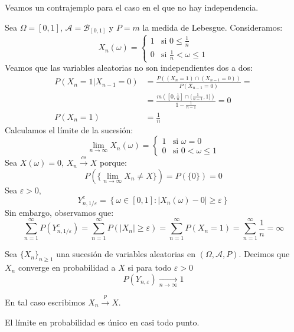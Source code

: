 \begin{example}
    Veamos un contrajemplo para el caso en el que no hay independencia.

    Sea $\Omega = [0, 1]$, $\mathcal{A} = \mathcal{B}_{[0, 1]}$ y $P = m$ la medida de Lebesgue.
    Consideramos:
    $$X_n(\omega) = \begin{cases}
            1 & \text{si } 0 \leq \frac{1}{n}          \\
            0 & \text{si } \frac{1}{n} < \omega \leq 1
        \end{cases}$$
    Veamos que las variables aleatorias no son independientes dos a dos:
    \begin{align*}
        P(X_n = 1 | X_{n-1} = 0) & = \frac{P((X_n = 1) \cap (X_{n-1} = 0))}{P(X_{n-1} = 0)} =                             \\
                                 & = \frac{m\left([0, \frac{1}{n}] \cap (\frac{1}{n-1}, 1]\right)}{1 - \frac{1}{n-1}} = 0 \\
        P(X_n = 1)               & = \frac{1}{n}
    \end{align*}
    Calculamos el límite de la sucesión:
    $$\lim\limits_{n \to \infty} X_n(\omega) = \begin{cases}
            1 & \text{si } \omega = 0        \\
            0 & \text{si } 0 < \omega \leq 1
        \end{cases}$$
    Sea $X(\omega) = 0$, $X_n \xrightarrow{cs} X$ porque:
    $$P(\{\lim\limits_{n \to \infty} X_n \neq X\}) = P(\{0\}) = 0$$
    Sea $\varepsilon > 0$,
    $$Y_{n, 1/\varepsilon}^c = \left\{ \omega \in [0, 1] : |X_n(\omega) - 0| \geq \varepsilon \right\}$$
    Sin embargo, observamos que:
    $$\sum_{n=1}^\infty P(Y_{n, 1/\varepsilon}^c) = \sum_{n=1}^\infty P(|X_n| \geq \varepsilon) = \sum_{n=1}^\infty P(X_n = 1) = \sum_{n=1}^\infty \frac{1}{n} = \infty$$
\end{example}

\begin{definition}
    Sea $\{X_n\}_{n \geq 1}$ una sucesión de variables aleatorias en $(\Omega, \mathcal{A}, P)$.
    Decimos que $X_n$ converge en probabilidad a $X$ si para todo $\varepsilon > 0$
    $$P(Y_{n, \varepsilon}) \xrightarrow[n \to \infty]{} 1$$

    En tal caso escribimos $X_n \xrightarrow{p} X$.
\end{definition}

\begin{theorem}
    El límite en probabilidad es único en casi todo punto.
\end{theorem}

